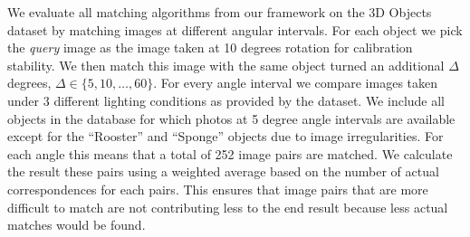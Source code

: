 \documentclass[10pt,twocolumn,letterpaper]{article}
\begin{document}
We evaluate all matching algorithms from our framework on the 3D Objects dataset by matching images at different angular intervals. For each object we pick the \emph{query} image as the image taken at 10 degrees rotation for calibration stability.  We then match this image with the same object turned an additional $\Delta$ degrees, $\Delta \in \{5, 10, \ldots, 60\}$.  For every angle interval we compare images taken under 3 different lighting conditions as provided by the dataset. We include all objects in the database for which photos at 5 degree angle intervals are available except for the ``Rooster'' and ``Sponge'' objects due to image irregularities. For each angle this means that a total of 252 image pairs are matched. We calculate the result these pairs using a weighted average based on the number of actual correspondences for each pairs. This ensures that image pairs that are more difficult to match are not contributing less to the end result because less actual matches would be found.
\end{document}
